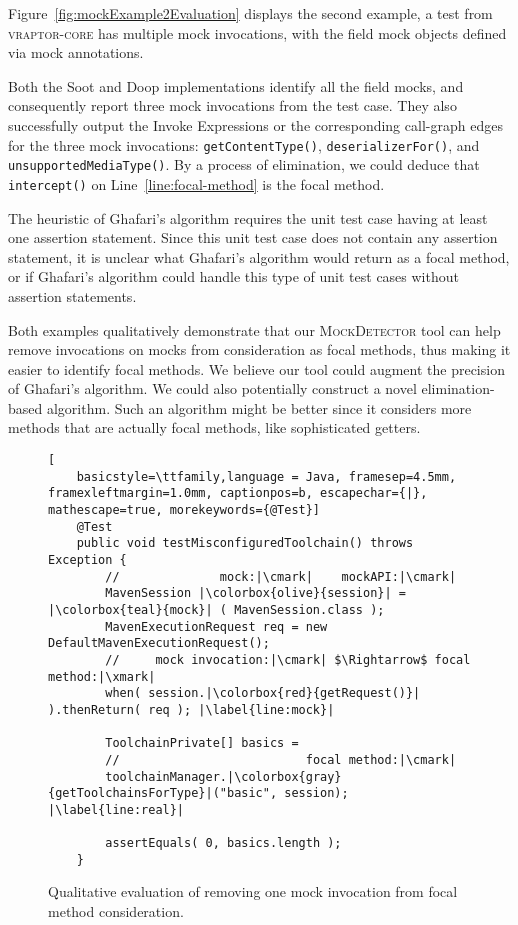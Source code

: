 Figure~\ref{fig:mockExample2Evaluation} displays the second example, a test from \textsc{vraptor-core} has multiple mock invocations, with the field mock objects defined via mock annotations. 

Both the Soot and Doop implementations identify all the field mocks, and consequently report three mock invocations from the test case. They also successfully output the Invoke Expressions or the corresponding call-graph edges for the three mock invocations: \texttt{getContentType()}, \texttt{deserializerFor()}, and \texttt{unsupportedMediaType()}. By a process of elimination, we could deduce that \texttt{intercept()} on Line~\ref{line:focal-method} is the focal method. 

The heuristic of Ghafari's algorithm requires the unit test case having at least one assertion statement. Since this unit test case does not contain any assertion statement, it is unclear what Ghafari's algorithm would return as a focal method, or if Ghafari's algorithm could handle this type of unit test cases without assertion statements.

Both examples qualitatively demonstrate that our \textsc{MockDetector} tool can help remove invocations on mocks from consideration as focal methods, thus making it easier to identify focal methods. We believe our tool could augment the precision of Ghafari's algorithm. We could also potentially construct a novel elimination-based algorithm. Such an algorithm might be better since it considers more methods that are actually focal methods, like sophisticated getters.

\begin{figure}[h]
	\begin{lstlisting}[
	basicstyle=\ttfamily,language = Java, framesep=4.5mm, framexleftmargin=1.0mm, captionpos=b, escapechar={|}, mathescape=true, morekeywords={@Test}]
	@Test
	public void testMisconfiguredToolchain() throws Exception {
		//        		mock:|\cmark|	 mockAPI:|\cmark|
		MavenSession |\colorbox{olive}{session}| = |\colorbox{teal}{mock}| ( MavenSession.class );
		MavenExecutionRequest req = new DefaultMavenExecutionRequest();
		//     mock invocation:|\cmark| $\Rightarrow$ focal method:|\xmark|
		when( session.|\colorbox{red}{getRequest()}| ).thenReturn( req ); |\label{line:mock}|
		
		ToolchainPrivate[] basics =
		//     					 	focal method:|\cmark|
		toolchainManager.|\colorbox{gray}{getToolchainsForType}|("basic", session); |\label{line:real}|
		
		assertEquals( 0, basics.length );
	}
	\end{lstlisting}
	
	\caption{Qualitative evaluation of removing one mock invocation from focal method consideration.}
	\label{fig:mockExampleEvaluation}
\end{figure}


